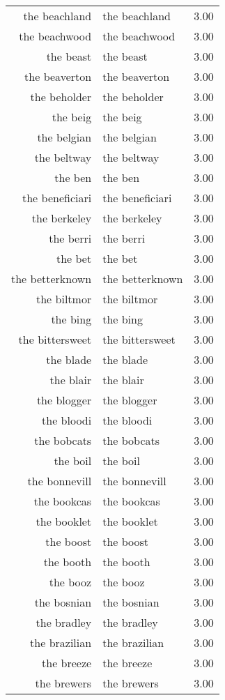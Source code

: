 \begin{table}[ht]
\begin{tabular}{rlr}
  the beachland & the beachland & 3.00 \\ 
  the beachwood & the beachwood & 3.00 \\ 
  the beast & the beast & 3.00 \\ 
  the beaverton & the beaverton & 3.00 \\ 
  the beholder & the beholder & 3.00 \\ 
  the beig & the beig & 3.00 \\ 
  the belgian & the belgian & 3.00 \\ 
  the beltway & the beltway & 3.00 \\ 
  the ben & the ben & 3.00 \\ 
  the beneficiari & the beneficiari & 3.00 \\ 
  the berkeley & the berkeley & 3.00 \\ 
  the berri & the berri & 3.00 \\ 
  the bet & the bet & 3.00 \\ 
  the betterknown & the betterknown & 3.00 \\ 
  the biltmor & the biltmor & 3.00 \\ 
  the bing & the bing & 3.00 \\ 
  the bittersweet & the bittersweet & 3.00 \\ 
  the blade & the blade & 3.00 \\ 
  the blair & the blair & 3.00 \\ 
  the blogger & the blogger & 3.00 \\ 
  the bloodi & the bloodi & 3.00 \\ 
  the bobcats & the bobcats & 3.00 \\ 
  the boil & the boil & 3.00 \\ 
  the bonnevill & the bonnevill & 3.00 \\ 
  the bookcas & the bookcas & 3.00 \\ 
  the booklet & the booklet & 3.00 \\ 
  the boost & the boost & 3.00 \\ 
  the booth & the booth & 3.00 \\ 
  the booz & the booz & 3.00 \\ 
  the bosnian & the bosnian & 3.00 \\ 
  the bradley & the bradley & 3.00 \\ 
  the brazilian & the brazilian & 3.00 \\ 
  the breeze & the breeze & 3.00 \\ 
  the brewers & the brewers & 3.00 \\ 

\end{tabular}
\end{table}
